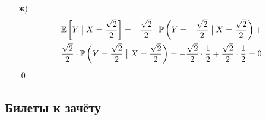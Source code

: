 \begin{enumerate}
\begin{enumerate}
\item[ж)]
\begin{multline*}
\mathbb{E}\left[Y\bigm|X = \frac{\sqrt{2}}{2}\right] = -\frac{\sqrt{2}}{2} \cdot \mathbb{P}\left(Y=-\frac{\sqrt{2}}{2} \bigm| X = \frac{\sqrt{2}}{2}\right) + \\
\frac{\sqrt{2}}{2} \cdot \mathbb{P}\left(Y=\frac{\sqrt{2}}{2} \bigm| X = \frac{\sqrt{2}}{2}\right) = -\frac{\sqrt{2}}{2} \cdot \frac{1}{2} + \frac{\sqrt{2}}{2} \cdot \frac{1}{2} = 0
\end{multline*}
\qed
\end{enumerate}

\end{enumerate}

\subsection{Билеты к зачёту}


